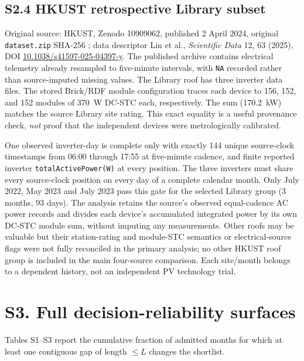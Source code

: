 \documentclass[11pt]{article}
\begin{document}
\subsection*{S2.4 HKUST retrospective Library subset}
Original source: HKUST, Zenodo 10909062, published 2 April 2024, original \texttt{dataset.zip} SHA-256 \texttt{}; data descriptor Lin et al., \emph{Scientific Data} 12, 63 (2025), DOI \href{https://doi.org/10.1038/s41597-025-04397-y}{10.1038/s41597-025-04397-y}. The published archive contains electrical telemetry already resampled to five-minute intervals, with \texttt{NA} recorded rather than source-imputed missing values. The Library roof has three inverter data files. The stored Brick/RDF module configuration traces each device to 156, 152, and 152 modules of 370~W DC-STC each, respectively. The sum (170.2~kW) matches the source Library site rating. This exact equality is a useful provenance check, \emph{not} proof that the independent devices were metrologically calibrated.

One observed inverter-day is complete only with exactly 144 unique source-clock timestamps from 06:00 through 17:55 at five-minute cadence, and finite reported inverter \texttt{totalActivePower(W)} at every position. The three inverters must share every source-clock position on every day of a complete calendar month. Only July 2022, May 2023 and July 2023 pass this gate for the selected Library group (3 months, 93 days). The analysis retains the source's observed equal-cadence AC power records and divides each device's accumulated integrated power by its own DC-STC module sum, without imputing any measurements. Other roofs may be valuable but their station-rating and module-STC semantics or electrical-source flags were not fully reconciled in the primary analysis; no other HKUST roof group is included in the main four-source comparison. Each site/month belongs to a dependent history, not an independent PV technology trial.

\section*{S3. Full decision-reliability surfaces}
Tables S1--S3 report the cumulative fraction of admitted months for which at least one contiguous gap of length $\le L$ changes the shortlist.
\end{document}
